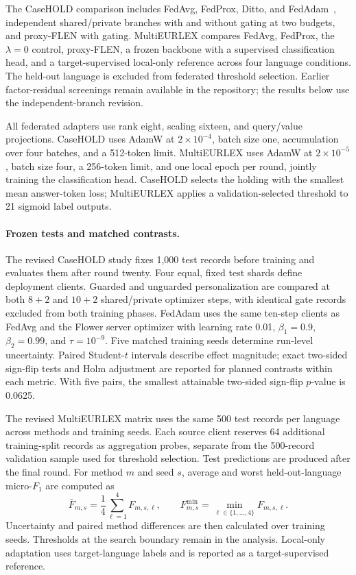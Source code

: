 \documentclass[a4paper,fleqn]{cas-sc}
\begin{document}
The CaseHOLD comparison includes FedAvg, FedProx, Ditto, and FedAdam~\citep{reddi2021adaptive}, independent shared/private branches with and without gating at two budgets, and proxy-FLEN with gating. MultiEURLEX compares FedAvg, FedProx, the $\lambda=0$ control, proxy-FLEN, a frozen backbone with a supervised classification head, and a target-supervised local-only reference across four language conditions. The held-out language is excluded from federated threshold selection. Earlier factor-residual screenings remain available in the repository; the results below use the independent-branch revision.



All federated adapters use rank eight, scaling sixteen, and query/value projections. CaseHOLD uses AdamW at $2\times10^{-4}$, batch size one, accumulation over four batches, and a 512-token limit. MultiEURLEX uses AdamW at $2\times10^{-5}$, batch size four, a 256-token limit, and one local epoch per round, jointly training the classification head. CaseHOLD selects the holding with the smallest mean answer-token loss; MultiEURLEX applies a validation-selected threshold to 21 sigmoid label outputs.

\paragraph{Frozen tests and matched contrasts.}
The revised CaseHOLD study fixes 1,000 test records before training and evaluates them after round twenty. Four equal, fixed test shards define deployment clients. Guarded and unguarded personalization are compared at both $8+2$ and $10+2$ shared/private optimizer steps, with identical gate records excluded from both training phases. FedAdam uses the same ten-step clients as FedAvg and the Flower server optimizer with learning rate 0.01, $\beta_1=0.9$, $\beta_2=0.99$, and $\tau=10^{-9}$. Five matched training seeds determine run-level uncertainty. Paired Student-$t$ intervals describe effect magnitude; exact two-sided sign-flip tests and Holm adjustment are reported for planned contrasts within each metric. With five pairs, the smallest attainable two-sided sign-flip $p$-value is 0.0625.

The revised MultiEURLEX matrix uses the same 500 test records per language across methods and training seeds. Each source client reserves 64 additional training-split records as aggregation probes, separate from the 500-record validation sample used for threshold selection. Test predictions are produced after the final round. For method $m$ and seed $s$, average and worst held-out-language micro-$F_1$ are computed as
\begin{equation}
 \bar F_{m,s}=\frac{1}{4}\sum_{\ell=1}^{4}F_{m,s,\ell},
 \qquad F^{\min}_{m,s}=\min_{\ell\in\{1,\ldots,4\}} F_{m,s,\ell}.
\end{equation}
Uncertainty and paired method differences are then calculated over training seeds. Thresholds at the search boundary remain in the analysis. Local-only adaptation uses target-language labels and is reported as a target-supervised reference.
\end{document}
